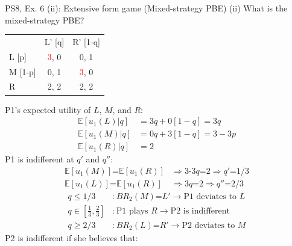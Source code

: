 \begin{frame}{PS8, Ex. 6 (ii): Extensive form game (Mixed-strategy PBE)}
    (ii) What is the mixed-strategy PBE? \vspace{-10pt}
    \begin{multicols}{2}
      \begin{table}
        \begin{tabular}{l|c|c|}
          \multicolumn{1}{c}{} & \multicolumn{1}{c}{L' [q]} & \multicolumn{1}{c}{R' [1-q]} \\\cline{2-3}
          L [p]   & \textcolor{red}{3}, 0 & 0, \color{blue}1 \\\cline{2-3}
          M [1-p] & 0, \color{blue}1 & \textcolor{red}{3}, 0 \\\cline{2-3}
          R       & 2, \color{blue}2 & 2, \color{blue}2 \\\cline{2-3}
        \end{tabular}
      \end{table} \vspace{-6pt}
      P1's expected utility of $L$, $M$, and $R$: \vspace{-6pt}
      \begin{align*}
        \mathbb{E}[u_1(L)|q]&=3q+0[1-q]=3q\\
        \mathbb{E}[u_1(M)|q]&=0q+3[1-q]=3-3p\\
        \mathbb{E}[u_1(R)|q]&=2
      \end{align*}
      P1 is indifferent at $q'$ and $q''$: \vspace{-6pt}
      \begin{align*}
        \mathbb{E}[u_1(M)]\text{=}\mathbb{E}[u_1(R)]&\Rightarrow \text{3-3}q\text{=}2\Rightarrow q'\text{=}1/3\\
        \mathbb{E}[u_1(L)]\text{=}\mathbb{E}[u_1(R)]&\Rightarrow 3q\text{=}2\Rightarrow q''\text{=}2/3
      \end{align*} \vspace{-20pt}
      \begin{align*}
        q\leq1/3&\text{:}\ BR_2(M)\text{=}L'\rightarrow\text{P1 deviates to }L\\
        q\text{$\in$}{\textstyle\left[\frac{1}{3},\frac{2}{3}\right]}&\text{:}\ \text{P1 plays }R\rightarrow\text{P2 is indifferent}\\
        q\geq2/3&\text{:}\ BR_2(L)\text{=}R'\rightarrow\text{P2 deviates to }M
      \end{align*}
      P2 is indifferent if she believes that: \vspace{-6pt}

\end{multicols}
\end{frame}
